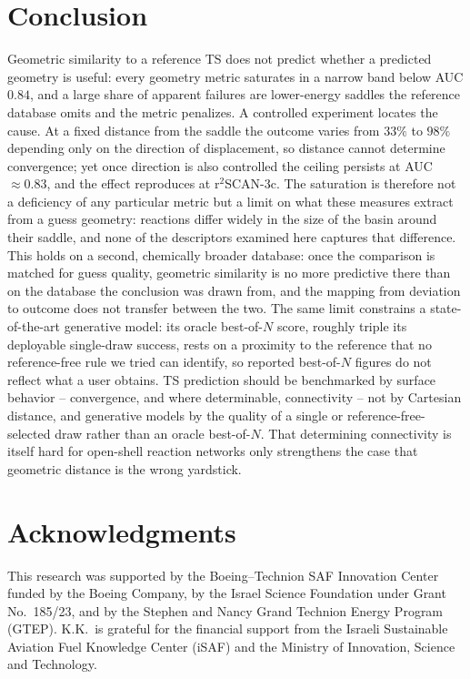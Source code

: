 \documentclass[11pt]{article}
\begin{document}
\section{Conclusion}
Geometric similarity to a reference TS does not predict whether a
predicted geometry is useful: every geometry metric saturates in a narrow band
below AUC $0.84$,
and a large share of apparent failures are lower-energy saddles the reference
database omits and the metric penalizes. A controlled experiment locates the
cause. At a fixed distance from the saddle the outcome varies from $33\%$ to
$98\%$ depending only on the direction of displacement, so distance cannot
determine convergence; yet once direction is also controlled the ceiling
persists at AUC $\approx 0.83$, and the effect reproduces at r$^2$SCAN-3c. The
saturation is therefore not a deficiency of
any particular metric but a limit on what these measures extract from a guess
geometry: reactions differ widely in the size of the basin around their saddle,
and none of the descriptors examined here captures that difference. This holds on a second, chemically
broader database: once the comparison is matched for guess quality, geometric
similarity is no more predictive there than on the database the conclusion was
drawn from, and the mapping from deviation to outcome does not transfer between
the two. The same limit constrains a state-of-the-art generative model: its
oracle best-of-$N$ score, roughly triple its deployable single-draw success,
rests on a proximity to the reference that no reference-free rule we tried can
identify, so reported best-of-$N$ figures do not reflect what a user obtains. TS prediction should be
benchmarked by surface behavior -- convergence, and where determinable,
connectivity -- not by Cartesian distance, and generative models by the quality of
a single or reference-free-selected draw rather than an oracle best-of-$N$. That
determining connectivity is itself hard for open-shell reaction networks only
strengthens the case that geometric distance is the wrong yardstick.

\section*{Acknowledgments}
This research was supported by the Boeing--Technion SAF Innovation Center funded
by the Boeing Company, by the Israel Science Foundation under Grant No.\ 185/23,
and by the Stephen and Nancy Grand Technion Energy Program (GTEP). K.K.\ is
grateful for the financial support from the Israeli Sustainable Aviation Fuel
Knowledge Center (iSAF) and the Ministry of Innovation, Science and Technology.
\end{document}
